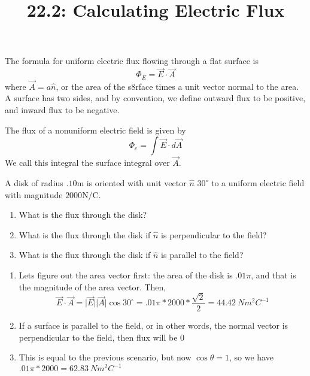 \documentclass{article}
\title{22.2: Calculating Electric Flux}
\begin{document}
\maketitle
\begin{definition}
The formula for uniform electric flux flowing through a flat surface is $$\Phi_E = \vec{E} \cdot \vec{A}$$where $\vec{A} = a\hat{n}$, or the area of the s8rface times a unit vector normal to the area. A surface has two sides, and by convention, we define outward flux to be positive, and inward flux to be negative.
\end{definition}

\begin{proposition}
The flux of a nonuniform electric field is given by $$\Phi_e = \int \vec{E}\cdot d\vec{A}$$We call this integral the surface integral over $\vec{A}$.
\end{proposition}

\begin{example}
A disk of radius $.10$m is oriented with unit vector $\hat{n}$ $30^\circ$ to a uniform electric field with magnitude $2000$N/C.
\begin{enumerate}
    \item What is the flux through the disk?
    \item What is the flux through the disk if $\hat{n}$ is perpendicular to the field?
    \item What is the flux through the disk if $\hat{n}$ is parallel to the field?
\end{enumerate}
\end{example}

\begin{solution}
\begin{enumerate}
    \item Lets figure out the area vector first: the area of the disk is $.01\pi $, and that is the magnitude of the area vector. Then, $$\vec{E} \cdot \vec{A} = \vert \vec{E}\vert \vert \vec{A}\vert \cos{30^\circ} = .01\pi * 2000 * \frac{\sqrt{2}}{2} = 44.42 \ N m^2 C^{-1}$$
    \item If a surface is parallel to the field, or in other words, the normal vector is perpendicular to the field, then flux will be $0$
    \item This is equal to the previous scenario, but now $\cos\theta = 1$, so we have $.01\pi * 2000 = 62.83 \ Nm^2C ^{-1} $ 
\end{enumerate}
\end{solution}
\end{document}
